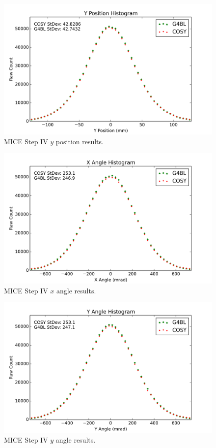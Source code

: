 \begin{figure}[h!]
  \centering
    \includegraphics[width=\textwidth]{MICE data/MICE_1M_y} 
  \caption{MICE Step IV $y$ position results.}
  \label{fig:micey}
\end{figure}

\begin{figure}[h!]
  \centering
    \includegraphics[width=\textwidth]{MICE data/MICE_1M_xangle} 
  \caption{MICE Step IV $x$ angle results.}
  \label{fig:micexangle}
\end{figure}

\begin{figure}[h!]
  \centering
    \includegraphics[width=\textwidth]{MICE data/MICE_1M_yangle} 
  \caption{MICE Step IV $y$ angle results.}
  \label{fig:miceyangle}
\end{figure}


